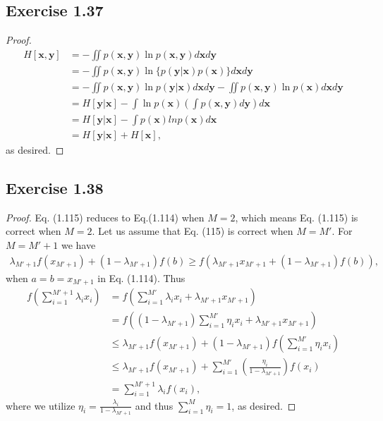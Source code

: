 \documentclass[11pt]{article}
\theoremstyle{definition}
\begin{document}
\subsection{Exercise 1.37}
\begin{proof}
\begin{align*}
H[\textbf{x},\textbf{y}] &= -\iint p(\textbf{x},\textbf{y})\ln p(\textbf{x},\textbf{y})d\textbf{x}d\textbf{y} \\
&= -\iint p(\textbf{x},\textbf{y})\ln \{p(\textbf{y}|\textbf{x})p(\textbf{x})\}d\textbf{x}d\textbf{y} \\
&= -\iint p(\textbf{x},\textbf{y})\ln p(\textbf{y}|\textbf{x}) d\textbf{x}d\textbf{y} -\iint p(\textbf{x},\textbf{y})\ln p(\textbf{x}) d\textbf{x}d\textbf{y} \\
&= H[\textbf{y}|\textbf{x}]-\int\ln p(\textbf{x})\left(\int p(\textbf{x},\textbf{y}) d\textbf{y}\right)d\textbf{x} \\
&= H[\textbf{y}|\textbf{x}]-\int p(\textbf{x})ln p(\textbf{x})d\textbf{x} \\
&= H[\textbf{y}|\textbf{x}] + H[\textbf{x}],
\end{align*}
as desired.
\end{proof}

\subsection{Exercise 1.38}
\begin{proof}
Eq. (1.115) reduces to Eq.(1.114) when $M=2$, which means Eq. (1.115) is correct when $M=2$. Let us assume that Eq. (115) is correct when $M = M'$. For $M = M'+1$ we have
\begin{align*}
\lambda_{M'+1}f(x_{M'+1}) + (1-\lambda_{M'+1})f(b) \geq f(\lambda_{M'+1}x_{M'+1} + (1-\lambda_{M'+1})f(b)),
\end{align*}
when $a = b = x_{M'+1}$ in Eq. (1.114). Thus
\begin{align*}
f\left(\sum^{M'+1}_{i=1}\lambda_ix_i\right) &= f\left(\sum^{M'}_{i=1}\lambda_ix_i + \lambda_{M'+1}x_{M'+1}\right) \\
&= f\left((1-\lambda_{M'+1})\sum^{M'}_{i=1}\eta_ix_i + \lambda_{M'+1}x_{M'+1}\right) \\
&\leq \lambda_{M'+1}f(x_{M'+1}) + (1-\lambda_{M'+1})f\left(\sum^{M'}_{i=1}\eta_ix_i\right) \\
&\leq \lambda_{M'+1}f(x_{M'+1}) + \sum^{M'}_{i=1}\left(\frac{\eta_i}{1-\lambda_{M'+1}}\right)f(x_i) \\
&= \sum^{M'+1}_{i=1}\lambda_if(x_i),
\end{align*}
where we utilize $\eta_i = \frac{\lambda_i}{1-\lambda_{M'+1}}$ and thus $\sum_{i=1}^{M}\eta_i = 1$, as desired.
\end{proof}
\end{document}
